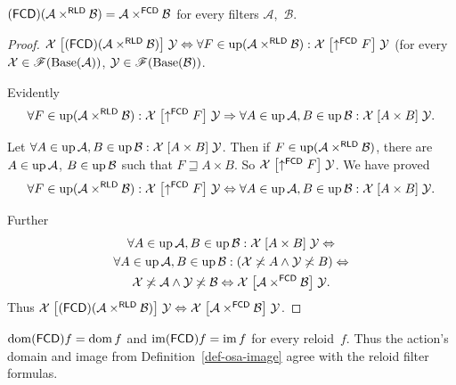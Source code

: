 \begin{prop}
\label{fcd-of-rprod}$(\mathsf{FCD})(\mathcal{A}\times^{\mathsf{RLD}}\mathcal{B})=\mathcal{A}\times^{\mathsf{FCD}}\mathcal{B}$
for every filters $\mathcal{A}$,~$\mathcal{B}$.\end{prop}
\begin{proof}
$\mathcal{X}\mathrel{\left[(\mathsf{FCD})(\mathcal{A}\times^{\mathsf{RLD}}\mathcal{B})\right]}\mathcal{Y}\Leftrightarrow\forall F\in\operatorname{up}(\mathcal{A}\times^{\mathsf{RLD}}\mathcal{B}):\mathcal{X}\mathrel{\left[\uparrow^{\mathsf{FCD}}F\right]}\mathcal{Y}$
(for every $\mathcal{X}\in\mathscr{F}(\operatorname{Base}(\mathcal{A}))$, $\mathcal{Y}\in\mathscr{F}(\operatorname{Base}(\mathcal{B}))$.

Evidently
\[
\forall F\in\operatorname{up}(\mathcal{A}\times^{\mathsf{RLD}}\mathcal{B}):\mathcal{X}\mathrel{\left[\uparrow^{\mathsf{FCD}}F\right]}\mathcal{Y}\Rightarrow\forall A\in\operatorname{up}\mathcal{A},B\in\operatorname{up}\mathcal{B}:\mathcal{X}\mathrel{\left[A\times B\right]}\mathcal{Y}.
\]


Let $\forall A\in\operatorname{up}\mathcal{A},B\in\operatorname{up}\mathcal{B}:\mathcal{X}\mathrel{\left[A\times B\right]}\mathcal{Y}$.
Then if $F\in\operatorname{up}(\mathcal{A}\times^{\mathsf{RLD}}\mathcal{B})$, there
are $A\in\operatorname{up}\mathcal{A}$, $B\in\operatorname{up}\mathcal{B}$ such that $F\sqsupseteq A\times B$.
So $\mathcal{X}\mathrel{\left[\uparrow^{\mathsf{FCD}}F\right]}\mathcal{Y}$. We
have proved
\[
\forall F\in\operatorname{up}(\mathcal{A}\times^{\mathsf{RLD}}\mathcal{B}):\mathcal{X}\mathrel{\left[\uparrow^{\mathsf{FCD}}F\right]}\mathcal{Y}\Leftrightarrow\forall A\in\operatorname{up}\mathcal{A},B\in\operatorname{up}\mathcal{B}:\mathcal{X}\mathrel{\left[A\times B\right]}\mathcal{Y}.
\]


Further
\begin{multline*}
\forall A\in\operatorname{up}\mathcal{A},B\in\operatorname{up}\mathcal{B}:\mathcal{X}\mathrel{\left[A\times B\right]}\mathcal{Y}\Leftrightarrow\\
\forall A\in\operatorname{up}\mathcal{A},B\in\operatorname{up}\mathcal{B}:(\mathcal{X}\not\asymp A\land\mathcal{Y}\not\asymp B)\Leftrightarrow\\
\mathcal{X}\not\asymp\mathcal{A}\land\mathcal{Y}\not\asymp\mathcal{B}\Leftrightarrow\mathcal{X}\mathrel{\left[\mathcal{A}\times^{\mathsf{FCD}}\mathcal{B}\right]}\mathcal{Y}.
\end{multline*}
Thus $\mathcal{X}\mathrel{\left[(\mathsf{FCD})(\mathcal{A}\times^{\mathsf{RLD}}\mathcal{B})\right]}\mathcal{Y}\Leftrightarrow\mathcal{X}\mathrel{\left[\mathcal{A}\times^{\mathsf{FCD}}\mathcal{B}\right]}\mathcal{Y}$.\end{proof}
\begin{prop}
$\operatorname{dom}(\mathsf{FCD}) f=\operatorname{dom} f$ and $\operatorname{im}(\mathsf{FCD}) f=\operatorname{im} f$ for every reloid~$f$.
Thus the action's domain and image from Definition~\ref{def-osa-image}
agree with the reloid filter formulas.\end{prop}
